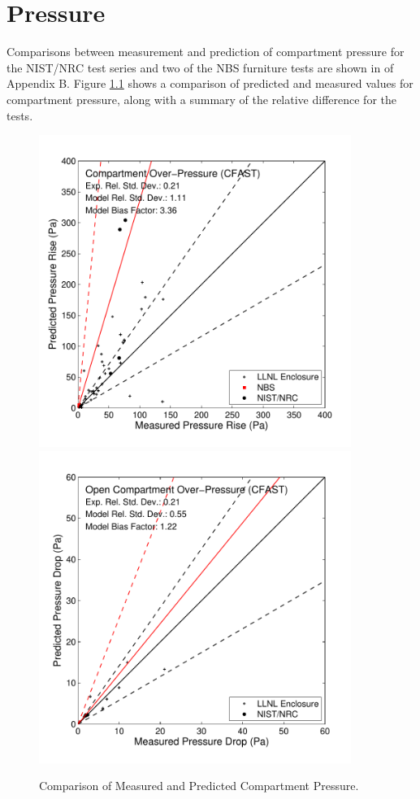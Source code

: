 \chapter{Pressure}

Comparisons between measurement and prediction of compartment pressure for the NIST/NRC test series and two of the NBS furniture tests are shown in of Appendix B.  Figure \ref{fig:Pressure_Scatter} shows a comparison of predicted and measured values for compartment pressure, along with a summary of the relative difference for the tests.

\begin{figure}
\begin{center}
\includegraphics[width=4.0in]{FIGURES/ScatterPlots/Compartment_Pressure}  \\
\includegraphics[width=4.0in]{FIGURES/ScatterPlots/Open_Compartment_Pressure}  \\
\end{center}
\caption{Comparison of Measured and Predicted Compartment Pressure.} \label{fig:Pressure_Scatter}
\end{figure}

